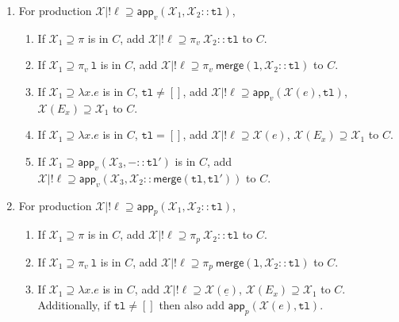 \documentclass[a4paper]{article}
\newcommand*\vbar{|}
\begin{document}
\begin{enumerate}
    \item For production $\mathcal{X}\vbar!\ell\supseteq\mathsf{app}_v(\mathcal{X_1},\mathcal{X_2} :: \mathtt{tl})$,
    \begin{enumerate}
        \item If $\mathcal{X_1}\supseteq\pi$ is in $C$, add $\mathcal{X}\vbar!\ell\supseteq\pi_v\:\mathcal{X_2}::\mathtt{tl}$ to $C$.
        \item If $\mathcal{X_1}\supseteq\pi_v\:\mathtt{l}$ is in $C$, add $\mathcal{X}\vbar!\ell\supseteq\pi_v\:\mathsf{merge}(\mathtt{l},\mathcal{X_2}::\mathtt{tl})$ to $C$.
        \item If $\mathcal{X_1}\supseteq \lambda x.e$ is in $C$, $\mathtt{tl}\neq[]$, add $\mathcal{X}\vbar!\ell\supseteq\mathsf{app}_v(\mathcal{X}(e),\mathtt{tl})$, $\mathcal{X}(E_x)\supseteq\mathcal{X_1}$ to $C$.
        \item If $\mathcal{X_1}\supseteq \lambda x.e$ is in $C$, $\mathtt{tl}=[]$, add $\mathcal{X}\vbar!\ell\supseteq \mathcal{X}(e)$, $\mathcal{X}(E_x)\supseteq\mathcal{X_1}$ to $C$.
        \item If $\mathcal{X_1}\supseteq\mathsf{app}_v(\mathcal{X}_3,-::\mathtt{tl}')$ is in $C$, add $\mathcal{X}\vbar!\ell\supseteq\mathsf{app}_v(\mathcal{X}_3,\mathcal{X_2}::\mathsf{merge}(\mathtt{tl},\mathtt{tl}'))$ to $C$.
    \end{enumerate}
    \item For production $\mathcal{X}\vbar!\ell\supseteq\mathsf{app}_p(\mathcal{X}_1,\mathcal{X}_2::\mathtt{tl})$,
    \begin{enumerate}
        \item If $\mathcal{X_1}\supseteq\pi$ is in $C$, add $\mathcal{X}\vbar!\ell\supseteq\pi_p\:\mathcal{X_2}::\mathtt{tl}$ to $C$.
        \item If $\mathcal{X_1}\supseteq\pi_v\:\mathtt{l}$ is in $C$, add $\mathcal{X}\vbar!\ell\supseteq\pi_p\:\mathsf{merge}(\mathtt{l},\mathcal{X_2}::\mathtt{tl})$ to $C$.
        \item If $\mathcal{X_1}\supseteq \lambda x.e$ is in $C$, add $\mathcal{X}\vbar!\ell\supseteq \mathcal{X}(\underline{e})$,
        $\mathcal{X}(E_x)\supseteq\mathcal{X_1}$ to $C$.
        Additionally, if $\texttt{tl} \ne []$ then also add $\mathsf{app}_p(\mathcal{X}(e),\mathtt{tl})$.

\end{enumerate}
\end{enumerate}
\end{document}
